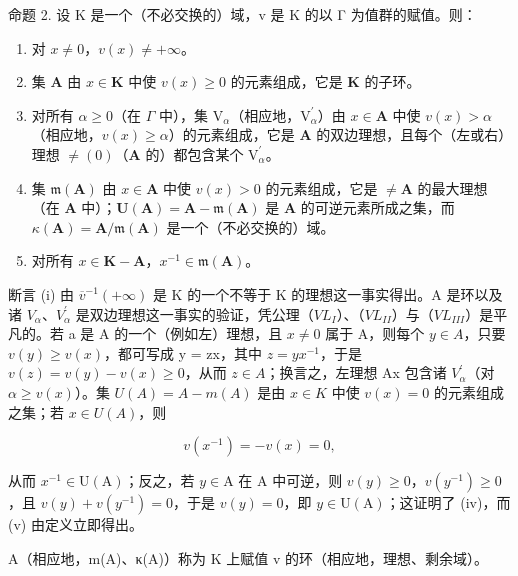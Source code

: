 命题 2. 设 K 是一个（不必交换的）域，v 是 K 的以 Γ 为值群的赋值。则：

\begin{enumerate}
\def\labelenumi{(\roman{enumi})}
\item
  对 \(x \neq 0\)，\(v(x) \neq +\infty\)。
\item
  集 \(\mathbf{A}\) 由 \(x\in \mathbf{K}\) 中使 \(v(x)\geqslant 0\) 的元素组成，它是 \(\mathbf{K}\) 的子环。
\item
  对所有 \(\alpha \geqslant 0\)（在 \(\Gamma\) 中），集 \(\mathrm{V}_{\alpha}\)（相应地，\(\mathrm{V}_{\alpha}^{\prime}\)）由 \(x \in \mathbf{A}\) 中使 \(v(x) > \alpha\)（相应地，\(v(x) \geqslant \alpha\)）的元素组成，它是 \(\mathbf{A}\) 的双边理想，且每个（左或右）理想 \(\neq (0)\)（\(\mathbf{A}\) 的）都包含某个 \(\mathrm{V}_{\alpha}^{\prime}\)。
\item
  集 \(\mathfrak{m}(\mathbf{A})\) 由 \(x \in \mathbf{A}\) 中使 \(v(x) > 0\) 的元素组成，它是 \(\neq \mathbf{A}\) 的最大理想（在 \(\mathbf{A}\) 中）；\(\mathbf{U}(\mathbf{A}) = \mathbf{A} - \mathfrak{m}(\mathbf{A})\) 是 \(\mathbf{A}\) 的可逆元素所成之集，而 \(\kappa(\mathbf{A}) = \mathbf{A} / \mathfrak{m}(\mathbf{A})\) 是一个（不必交换的）域。
\item
  对所有 \(x \in \mathbf{K} - \mathbf{A}\)，\(x^{-1} \in \mathfrak{m}(\mathbf{A})\)。
\end{enumerate}

断言 (i) 由 \(\overline{v}^{-1}(+\infty)\) 是 K 的一个不等于 K 的理想这一事实得出。A 是环以及诸 \(V_{\alpha}\)、\(V_{\alpha}^{\prime}\) 是双边理想这一事实的验证，凭公理（\(VL_{I}\)）、（\(VL_{II}\)）与（\(VL_{III}\)）是平凡的。若 a 是 A 的一个（例如左）理想，且 \(x \neq 0\) 属于 A，则每个 \(y \in A\)，只要 \(v(y) \geqslant v(x)\)，都可写成 y = zx，其中 \(z = yx^{-1}\)，于是 \(v(z) = v(y) - v(x) \geqslant 0\)，从而 \(z \in A\)；换言之，左理想 Ax 包含诸 \(V_{\alpha}^{\prime}\)（对 \(\alpha \geqslant v(x)\)）。集 \(U(A) = A - m(A)\) 是由 \(x \in K\) 中使 \(v(x) = 0\) 的元素组成之集；若 \(x \in U(A)\)，则

\[
v (x ^ {- 1}) = - v (x) = 0,
\]

从而 \(x^{-1} \in \mathrm{U}(\mathrm{A})\)；反之，若 \(y \in \mathrm{A}\) 在 \(\mathrm{A}\) 中可逆，则 \(v(y) \geqslant 0\)，\(v(y^{-1}) \geqslant 0\)，且 \(v(y) + v(y^{-1}) = 0\)，于是 \(v(y) = 0\)，即 \(y \in \mathrm{U}(\mathrm{A})\)；这证明了 (iv)，而 (v) 由定义立即得出。

A（相应地，m(A)、κ(A)）称为 K 上赋值 v 的环（相应地，理想、剩余域）。

